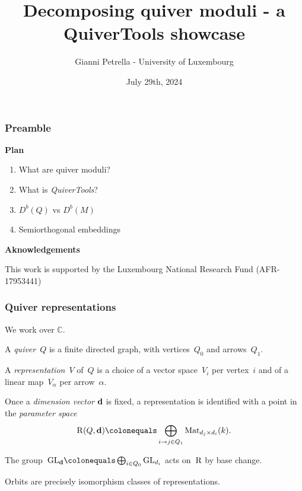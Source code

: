 \documentclass{beamer}
\title{Decomposing quiver moduli - a QuiverTools showcase}
\author{Gianni Petrella - University of Luxembourg}
\institute{MEGA 2024 - MPI MIS Leipzig}
\date{July 29th, 2024}
\begin{document}
\begin{frame}
    \titlepage
\end{frame}

\begin{frame}
    \frametitle{Preamble}
\textbf{Plan}
\begin{enumerate}
    \item What are quiver moduli?
    \item What is \emph{QuiverTools}?
    \item $D^b(Q)$ vs $D^b(M)$
    \item Semiorthogonal embeddings
\end{enumerate} \pause

\textbf{Aknowledgements}

This work is supported by the Luxembourg National Research Fund (AFR-17953441)

\end{frame}

\begin{frame}
    \frametitle{Quiver representations}
\begin{definition}
    We work over $\mathbb{C}$. \pause

    A \emph{quiver}~$Q$ is a finite directed graph, with
    vertices~$Q_0$ and arrows~$Q_1$.

    A \emph{representation}~$V$ of~$Q$ is
    a choice of a vector space~$V_i$ per vertex~$i$
    and of a linear map~$V_{\alpha}$ per arrow~$\alpha$.
\end{definition} \pause

Once a \emph{dimension vector} $\mathbf{d}$ is fixed, a representation
is identified with a point in the \emph{parameter space}
\[
    \parameterspace(Q, \tuple{d})
    \colonequals \bigoplus_{i \to j \in Q_1}
    \Mat_{d_j \times d_i}(k).
\] \pause

The group~${\GL}_{\tuple{d}} \colonequals \bigoplus_{i \in Q_0} \GL_{d_i}$
acts on~$\operatorname{R}$ by base change. \pause

Orbits are precisely isomorphism classes of representations.
\end{frame}
\end{document}
